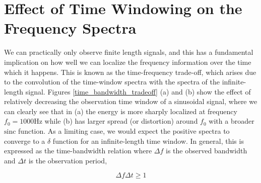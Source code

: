 \documentclass[10pt]{article}
\begin{document}
\section{Effect of Time Windowing on the Frequency Spectra}

We can practically only observe finite length signals, and this has a fundamental implication on how well we can localize the frequency information over the time which it happens. This is known as the time-frequency trade-off, which arises due to the convolution of the time-window spectra with the spectra of the infinite-length signal. Figures \ref{time_bandwidth_tradeoff} (a) and (b) show the effect of relatively decreasing the observation time window of a sinusoidal signal, where we can clearly see that in (a) the energy is more sharply localized at frequency $f_0 = 1000$Hz while (b) has larger spread (or distortion) around $f_0$ with a broader $\text{sinc}$ function. As a limiting case, we would expect the positive spectra to converge to a $\delta$ function for an infinite-length time window. In general, this is expressed as the time-bandwidth relation where $\Delta f$ is the observed bandwidth and $\Delta t$ is the observation period,

\[
\Delta f \Delta t \geq 1 
\]
\end{document}
